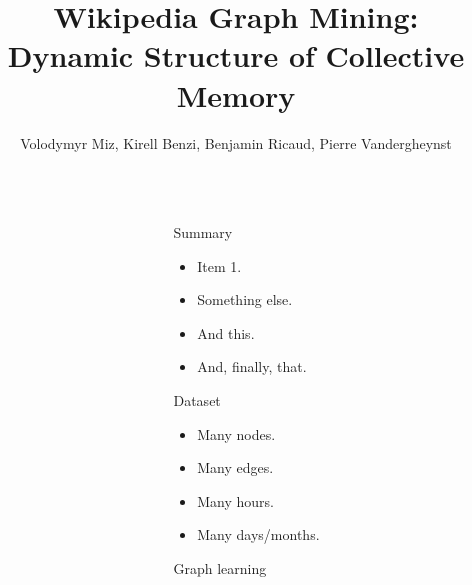 \documentclass[final]{beamer}
\title{Wikipedia Graph Mining: \\ Dynamic Structure of Collective Memory}
\author{Volodymyr Miz, Kirell Benzi, Benjamin Ricaud, Pierre Vandergheynst}
\institute{Swiss Federal Institute of Technology (EPFL)}
\newlength{\sepwid}
\newlength{\twocolwid}
\begin{document}

\setlength{\belowcaptionskip}{2ex} %
\setlength\belowdisplayshortskip{2ex} %

\begin{frame}[t] %
\begin{columns}[t] %
\begin{column}{\sepwid}\end{column} %
\begin{column}{\twocolwid} %


\begin{alertblock}{Summary} %

	\begin{itemize}
		\item Item 1.
		\item Something else.
		\item And this.
		\item And, finally, that.
	\end{itemize}
\end{alertblock}

\begin{alertblock}{Dataset}
	\begin{itemize}
		\item Many nodes.
		\item Many edges.
		\item Many hours.
		\item Many days/months.
	\end{itemize}
\end{alertblock}

\begin{block}{Graph learning}
\vspace{0.5em}
\begin{figure}
	\begin{minipage}{0.74\linewidth}
	\end{minipage} \hfill
	\begin{minipage}{0.24\linewidth}
	\end{minipage}
\end{figure}
\vspace{-1em}


\end{block}
\end{column}
\end{columns}
\end{frame}
\end{document}

